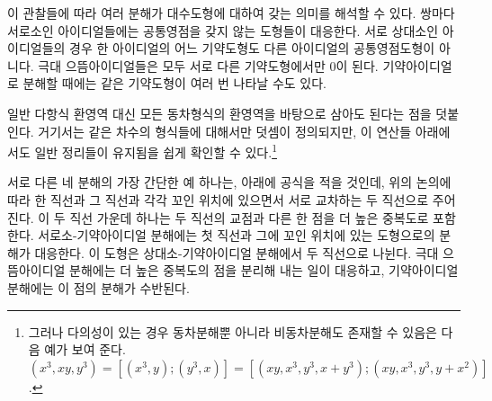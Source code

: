 이 관찰들에 따라 여러 분해가 대수도형에 대하여 갖는 의미를 해석할 수 있다. 쌍마다 서로소인 아이디얼들에는 공통영점을 갖지 않는 도형들이 대응한다. 서로 상대소인 아이디얼들의 경우 한 아이디얼의 어느 기약도형도 다른 아이디얼의 공통영점도형이 아니다. 극대 으뜸아이디얼들은 모두 서로 다른 기약도형에서만 0이 된다. 기약아이디얼로 분해할 때에는 같은 기약도형이 여러 번 나타날 수도 있다.

일반 다항식 환영역 대신 모든 동차형식의 환영역을 바탕으로 삼아도 된다는 점을 덧붙인다. 거기서는 같은 차수의 형식들에 대해서만 덧셈이 정의되지만, 이 연산들 아래에서도 일반 정리들이 유지됨을 쉽게 확인할 수 있다.\footnote{그러나 다의성이 있는 경우 동차분해뿐 아니라 비동차분해도 존재할 수 있음은 다음 예가 보여 준다. $(x^3,xy,y^3)=[(x^3,y);(y^3,x)]=[(xy,x^3,y^3,x+y^3);(xy,x^3,y^3,y+x^2)]$.}

서로 다른 네 분해의 가장 간단한 예 하나는, 아래에 공식을 적을 것인데, 위의 논의에 따라 한 직선과 그 직선과 각각 꼬인 위치에 있으면서 서로 교차하는 두 직선으로 주어진다. 이 두 직선 가운데 하나는 두 직선의 교점과 다른 한 점을 더 높은 중복도로 포함한다. 서로소-기약아이디얼 분해에는 첫 직선과 그에 꼬인 위치에 있는 도형으로의 분해가 대응한다. 이 도형은 상대소-기약아이디얼 분해에서 두 직선으로 나뉜다. 극대 으뜸아이디얼 분해에는 더 높은 중복도의 점을 분리해 내는 일이 대응하고, 기약아이디얼 분해에는 이 점의 분해가 수반된다.

